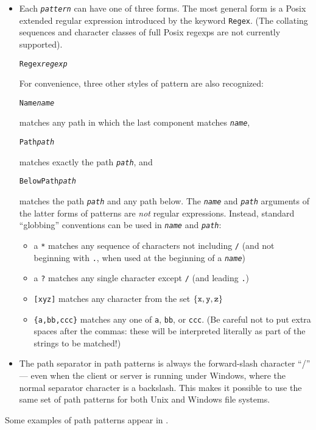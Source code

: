 \documentclass{article}
\newcommand{\ARG}[1]{\texttt{\textit{#1}}}
\begin{document}
\begin{itemize}
\item Each \ARG{pattern} can have one of three forms.  The most
general form is a Posix extended regular expression introduced by the
keyword \verb|Regex|.  (The collating sequences and character classes of
full Posix regexps are not currently supported).
\begin{alltt}
                 Regex \ARG{regexp}
\end{alltt}
For convenience, three other styles of pattern are also recognized:
\begin{alltt}
                 Name \ARG{name}
\end{alltt}
matches any path in which the last component matches \ARG{name},
\begin{alltt}
                 Path \ARG{path}
\end{alltt}
matches exactly the path \ARG{path}, and
\begin{alltt}
                 BelowPath \ARG{path}
\end{alltt}
matches the path \ARG{path} and any path below.
%
The \ARG{name} and \ARG{path} arguments of the latter forms of
patterns are {\em not} regular expressions.  Instead,
standard ``globbing'' conventions can be used in \ARG{name} and
\ARG{path}:
\begin{itemize}
\item a \verb|*| matches any sequence of characters not including \verb|/|
(and not beginning with \verb|.|, when used at the beginning of a
\ARG{name})
\item a \verb|?| matches any single character except \verb|/| (and leading
  \verb|.|)
\item \verb|[xyz]| matches any character from the set $\{{\tt x},
  {\tt y}, {\tt z} \}$
\item \verb|{a,bb,ccc}| matches any one of \verb|a|, \verb|bb|, or
  \verb|ccc|.  (Be careful not to put extra spaces after the commas:
  these will be interpreted literally as part of the strings to be matched!)
\end{itemize}
\item
The path separator in path patterns is always the
forward-slash character ``/'' --- even when the client or server is
running under Windows, where the normal separator character is a
backslash.  This makes it possible to use the same set of path
patterns for both Unix and Windows file systems.
\end{itemize}
Some examples of path patterns appear in .
\end{document}
